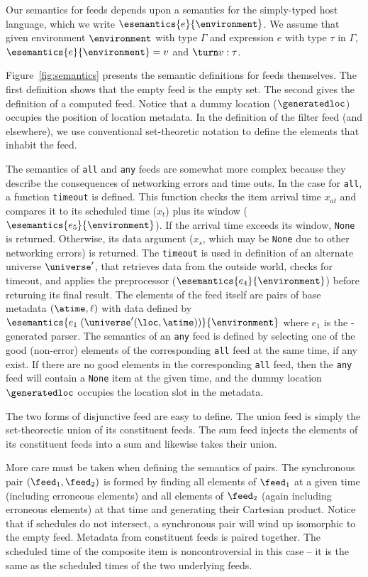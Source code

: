 Our semantics for feeds depends upon a semantics for the simply-typed
host language, which we write $\esemantics{e}{\environment}$. We assume that
given environment $\environment$ with type $\Gamma$ 
and expression $e$ with type $\tau$ in $\Gamma$, 
$\esemantics{e}{\environment} = v$
and $\turn v : \tau$.

Figure~\ref{fig:semantics} presents the semantic definitions for feeds themselves.
The first definition shows that the empty feed is the empty set. The
second gives the definition of a computed feed.  Notice that a
dummy location ($\generatedloc$) occupies the position of location
metadata.  In the definition of the filter feed (and elsewhere), 
we use conventional set-theoretic notation to define the elements
that inhabit the feed.

The semantics of {\tt all} and {\tt any} feeds are somewhat more complex
because they describe the consequences of networking errors and time outs.
In the case for {\tt all}, a function {\tt timeout} is defined.  This
function checks the item arrival time $x_{at}$ and compares it to its
scheduled time ($x_t$) plus its window ($\esemantics{e_5}{\environment}$).  If
the arrival time exceeds its window, {\tt None} is returned. Otherwise,
its data argument ($x_s$, which may be {\tt None} due to other networking 
errors) is returned.  The {\tt timeout} is used in definition of an 
alternate universe $\universe'$, that retrieves data from the outside world,
checks for timeout, and applies the preprocessor 
($\esemantics{e_4}{\environment}$) before returning its final result.
The elements of the feed itself are pairs of base metadata $(\atime,\ell)$
with data defined by $\esemantics{e_1 \; (\universe'(\loc,\atime))}{\environment}$
where $e_1$ is the \pads{}-generated parser.
The semantics of an {\tt any} feed is defined by selecting one of the
good (non-error) elements of the corresponding {\tt all} feed at the same time,
if any exist.  If there are no good elements in 
 the corresponding {\tt all} feed, then the {\tt any} feed will contain a
{\tt None} item at the given time, and the dummy location $\generatedloc$
occupies the location slot in the metadata.

The two forms of disjunctive feed are easy to define.  The
union feed is simply the set-theorectic union of
its constituent feeds.  The sum feed injects the elements of its constituent
feeds into a sum and likewise takes their union.

More care must be taken when defining the semantics of pairs.
The synchronous pair $(\feed_1,\feed_2)$
is formed by finding all elements of $\feed_1$
at a given time (including erroneous elements) 
and all elements of  $\feed_2$ (again including erroneous elements) 
at that time and
generating their Cartesian product.  Notice that if schedules 
do not intersect, a synchronous pair will wind up isomorphic to the
empty feed.  Metadata from constituent feeds is paired together.
The scheduled time of the composite item is noncontroversial in this case --
it is the same as the scheduled times of the two underlying feeds.

